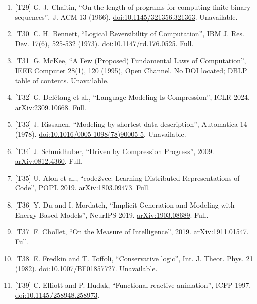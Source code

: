 \documentclass[10pt,letterpaper]{article}
\begin{document}
\begin{enumerate}
  (1965); English reprint, International Journal of Computer Mathematics
  2 (1968),
  \href{https://doi.org/10.1080/00207166808803030}{doi:10.1080/00207166808803030}.
  Full (page numbers from the 1968 reprint).
\item
  {[}T29{]} G. J. Chaitin, ``On the length of programs for computing
  finite binary sequences'', J. ACM 13 (1966).
  \href{https://doi.org/10.1145/321356.321363}{doi:10.1145/321356.321363}.
  Unavailable.
\item
  {[}T30{]} C. H. Bennett, ``Logical Reversibility of Computation'', IBM
  J. Res. Dev. 17(6), 525-532 (1973).
  \href{https://doi.org/10.1147/rd.176.0525}{doi:10.1147/rd.176.0525}.
  Full.
\item
  {[}T31{]} G. McKee, ``A Few (Proposed) Fundamental Laws of
  Computation'', IEEE Computer 28(1), 120 (1995), Open Channel. No DOI
  located;
  \href{https://vldb.org/dblp/db/journals/computer/computer28.html}{DBLP
  table of contents}. Unavailable.
\item
  {[}T32{]} G. Delétang et al., ``Language Modeling Is Compression'',
  ICLR 2024. \href{https://arxiv.org/abs/2309.10668}{arXiv:2309.10668}.
  Full.
\item
  {[}T33{]} J. Rissanen, ``Modeling by shortest data description'',
  Automatica 14 (1978).
  \href{https://doi.org/10.1016/0005-1098(78)90005-5}{doi:10.1016/0005-1098(78)90005-5}.
  Unavailable.
\item
  {[}T34{]} J. Schmidhuber, ``Driven by Compression Progress'', 2009.
  \href{https://arxiv.org/abs/0812.4360}{arXiv:0812.4360}. Full.
\item
  {[}T35{]} U. Alon et al., ``code2vec: Learning Distributed
  Representations of Code'', POPL 2019.
  \href{https://arxiv.org/abs/1803.09473}{arXiv:1803.09473}. Full.
\item
  {[}T36{]} Y. Du and I. Mordatch, ``Implicit Generation and Modeling
  with Energy-Based Models'', NeurIPS 2019.
  \href{https://arxiv.org/abs/1903.08689}{arXiv:1903.08689}. Full.
\item
  {[}T37{]} F. Chollet, ``On the Measure of Intelligence'', 2019.
  \href{https://arxiv.org/abs/1911.01547}{arXiv:1911.01547}. Full.
\item
  {[}T38{]} E. Fredkin and T. Toffoli, ``Conservative logic'', Int. J.
  Theor. Phys. 21 (1982).
  \href{https://doi.org/10.1007/BF01857727}{doi:10.1007/BF01857727}.
  Unavailable.
\item
  {[}T39{]} C. Elliott and P. Hudak, ``Functional reactive animation'',
  ICFP 1997.
  \href{https://doi.org/10.1145/258948.258973}{doi:10.1145/258948.258973}.

\end{enumerate}
\end{document}
